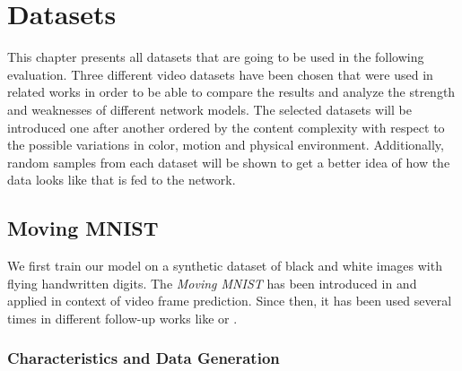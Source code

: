 
\chapter{Datasets} \label{chapter:datasets}

This chapter presents all datasets that are going to be used in the following evaluation. Three different video datasets have been chosen that were used in related works in order to be able to compare the results and analyze the strength and weaknesses of different network models. The selected datasets will be introduced one after another ordered by the content complexity with respect to the possible variations in color, motion and physical environment. Additionally, random samples from each dataset will be shown to get a better idea of how the data looks like that is fed to the network.


\section{Moving MNIST} \label{sec:ds_mm}


We first train our model on a synthetic dataset of black and white images with flying handwritten digits. The \textit{Moving MNIST} has been introduced in \parencite{unsup_learn_lstm} and applied in context of video frame prediction. Since then, it has been used several times in different follow-up works like \parencite{spat_temp_video_autoenc} or \parencite{conv_lstm_nowcasting}. 

\subsection{Characteristics and Data Generation}

